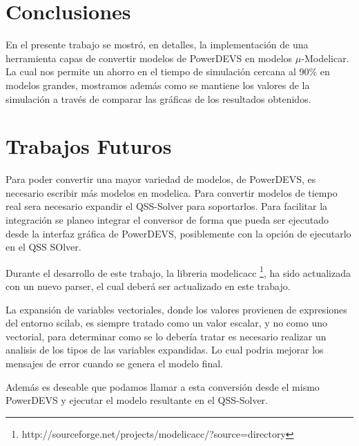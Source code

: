 
\section{Conclusiones}

	En el presente trabajo se mostró, en detalles, la implementación de una herramienta capas de convertir modelos de PowerDEVS en modelos $\mu$-Modelicar.  
	La cual nos permite un ahorro en el tiempo de simulación cercana al 90\% en modelos grandes, mostramos además como se mantiene los valores de la 
	simulación a través de comparar las gráficas de los resultados obtenidos.

\section{Trabajos Futuros}
	Para poder convertir una mayor variedad de modelos, de PowerDEVS, es necesario escribir más modelos en modelica.
	Para convertir modelos de tiempo real sera necesario expandir el QSS-Solver para soportarlos.
	Para facilitar la integración se planeo integrar el conversor de forma que pueda ser ejecutado desde la interfaz gráfica de PowerDEVS, posiblemente 
	con la opción de ejecutarlo en el QSS SOlver.

	Durante el desarrollo de este trabajo, la libreria modelicacc \footnote{http://sourceforge.net/projects/modelicacc/?source=directory}, ha sido actualizada 
	con un nuevo parser, el cual deberá ser actualizado en este trabajo.

	La expansión de variables vectoriales, donde los valores provienen de expresiones del entorno scilab, es siempre tratado como un valor escalar, y no como 
	uno vectorial, para determinar como se lo debería tratar es necesario realizar un analisis de los tipos de las variables expandidas. 
	Lo cual podria mejorar los mensajes de error cuando se genera el modelo final.

	Además es deseable que podamos llamar a esta conversión desde el mismo PowerDEVS y ejecutar el modelo resultante en el QSS-Solver.

